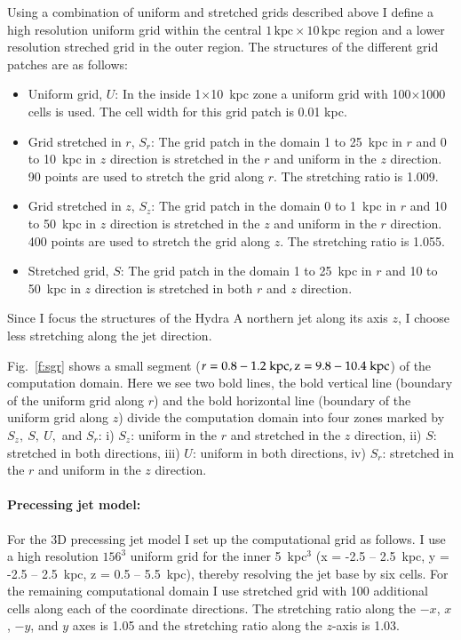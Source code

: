 Using a combination of uniform and stretched grids described above I define a high resolution uniform grid within the central $1\,\mathrm{kpc}\times10\,\mathrm{kpc}$ region and a lower resolution streched grid in the outer region. The structures of the different grid patches are as follows: \\
\begin{itemize}
\item Uniform grid, $U$: In the inside 1$\times$10~kpc zone a uniform grid with 100$\times$1000 cells is used. The cell width for this grid patch is 0.01 kpc. 
\item Grid stretched in $r$, $S_r$: The grid patch in the domain 1 to 25~kpc in $r$ and 0 to 10~kpc in $z$ direction is stretched in the $r$ and uniform in the $z$ direction. 90 points are used to stretch the grid along $r$. The stretching ratio is 1.009.  
\item Grid stretched in $z$, $S_z$: The grid patch in the domain 0 to 1~kpc in $r$ and 10 to 50~kpc in $z$ direction is stretched in the $z$ and uniform in the $r$ direction. 400 points are used to stretch the grid along $z$. The stretching ratio is 1.055. 
\item Stretched grid, $S$: The grid patch in the domain 1 to 25~kpc in $r$ and 10 to 50~kpc in $z$ direction is stretched in both $r$ and $z$ direction.
\end{itemize}
Since I focus the structures of the Hydra A northern jet along its axis $z$, I choose less stretching along the jet direction.
 
 Fig.~\ref{f:sgr} shows a small segment ($r= 0.8 - 1.2~ \rm kpc, z = 9.8-10.4~\rm kpc$) of the computation domain. Here we see two bold lines, the bold vertical line (boundary of the uniform grid along $r$) and the bold horizontal line (boundary of the uniform grid along $z$) divide the computation domain into four zones marked by $S_z, \ S, \ U,$ and $S_r$: i) $S_z$: uniform in the $r$ and stretched in the $z$ direction, ii) $S$: stretched in both directions, iii) $U$: uniform in both directions, iv) $S_r$: stretched in the $r$ and uniform in the $z$ direction. 
 
 \paragraph{Precessing jet model:}
 For the 3D precessing jet model I set up the computational grid as follows. I use a high resolution $156^3$ uniform grid for the inner 5~kpc$^3$ (x = -2.5 -- 2.5~kpc, y = -2.5 -- 2.5~kpc, z = 0.5 -- 5.5~kpc), thereby resolving the jet base by six cells. For the remaining computational domain I use stretched grid with 100 additional cells along each of the coordinate directions. The stretching ratio along the $-x$, $x$, $-y$, and $y$ axes is 1.05 and the stretching ratio along the $z$-axis is 1.03. 

